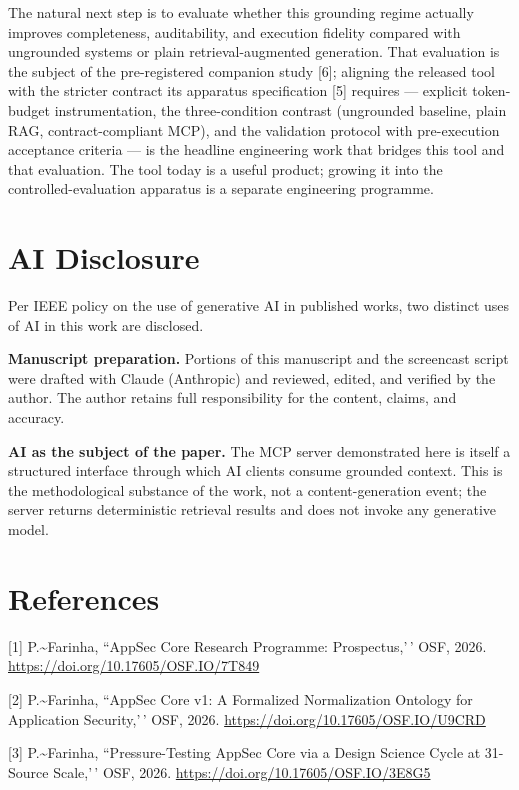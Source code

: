 \documentclass[conference]{IEEEtran}
\begin{document}
The natural next step is to evaluate whether this grounding regime
actually improves completeness, auditability, and execution fidelity
compared with ungrounded systems or plain retrieval-augmented
generation. That evaluation is the subject of the pre-registered
companion study {[}6{]}; aligning the released tool with the stricter
contract its apparatus specification {[}5{]} requires --- explicit
token-budget instrumentation, the three-condition contrast (ungrounded
baseline, plain RAG, contract-compliant MCP), and the validation
protocol with pre-execution acceptance criteria --- is the headline
engineering work that bridges this tool and that evaluation. The tool
today is a useful product; growing it into the controlled-evaluation
apparatus is a separate engineering programme.

\section{AI Disclosure}\label{ai-disclosure}

Per IEEE policy on the use of generative AI in published works, two
distinct uses of AI in this work are disclosed.

\textbf{Manuscript preparation.} Portions of this manuscript and the
screencast script were drafted with Claude (Anthropic) and reviewed,
edited, and verified by the author. The author retains full
responsibility for the content, claims, and accuracy.

\textbf{AI as the subject of the paper.} The MCP server demonstrated
here is itself a structured interface through which AI clients consume
grounded context. This is the methodological substance of the work, not
a content-generation event; the server returns deterministic retrieval
results and does not invoke any generative model.

\section{References}\label{references}

{[}1{]} P.\textasciitilde Farinha, ``AppSec Core Research Programme:
Prospectus,'\,' OSF, 2026. \url{https://doi.org/10.17605/OSF.IO/7T849}

{[}2{]} P.\textasciitilde Farinha, ``AppSec Core v1: A Formalized
Normalization Ontology for Application Security,'\,' OSF, 2026.
\url{https://doi.org/10.17605/OSF.IO/U9CRD}

{[}3{]} P.\textasciitilde Farinha, ``Pressure-Testing AppSec Core via a
Design Science Cycle at 31-Source Scale,'\,' OSF, 2026.
\url{https://doi.org/10.17605/OSF.IO/3E8G5}
\end{document}

